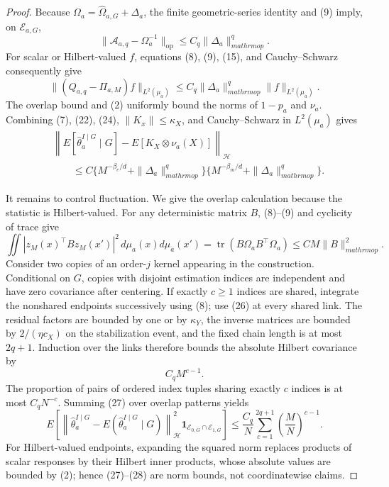 \documentclass{article}
\begin{document}
\begin{proof}
Because
\(
 \Omega_a=\widehat\Omega_{a,G}+\Delta_a
\), the finite geometric-series identity and (9) imply, on \(\mathcal E_{a,G}\),
\[
 \|\mathcal A_{a,q}-\Omega_a^{-1}\|_{\mathrm{op}}
 \leq C_q\|\Delta_a\|_{mathrm{op}}^q.
 \tag{23}
\]
For scalar or Hilbert-valued \(f\), equations (8), (9), (15), and Cauchy--Schwarz consequently give
\[
 \|(Q_{a,q}-\Pi_{a,M})f\|_{L^2(\mu_a)}
 \leq C_q\|\Delta_a\|_{mathrm{op}}^q
       \|f\|_{L^2(\mu_a)}.
 \tag{24}
\]
The overlap bound and (2) uniformly bound the norms of \(1-p_a\) and \(\nu_a\).  Combining (7), (22), (24), \(\|K_x\|\leq\kappa_X\), and Cauchy--Schwarz in \(L^2(\mu_a)\) gives
\[
 \begin{aligned}
 &\left\|E[\widehat\theta_a^{I\mid G}\mid G]
       -E[K_X\otimes\nu_a(X)]\right\|_{\mathcal H}\\
 &\qquad\leq
 C\{M^{-\beta_e/d}+\|\Delta_a\|_{mathrm{op}}^q\}
  \{M^{-\beta_m/d}+\|\Delta_a\|_{mathrm{op}}^q\}.
 \end{aligned}
 \tag{25}
\]

It remains to control fluctuation.  We give the overlap calculation because the statistic is Hilbert-valued.  For any deterministic matrix \(B\), (8)--(9) and cyclicity of trace give
\[
 \iint|z_M(x)^\top Bz_M(x')|^2
       \,d\mu_a(x)d\mu_a(x')
 =\operatorname{tr}(B\Omega_aB^\top\Omega_a)
 \leq CM\|B\|_{mathrm{op}}^2.
 \tag{26}
\]
Consider two copies of an order-\(j\) kernel appearing in the construction.  Conditional on \(G\), copies with disjoint estimation indices are independent and have zero covariance after centering.  If exactly \(c\geq1\) indices are shared, integrate the nonshared endpoints successively using (8); use (26) at every shared link.  The residual factors are bounded by one or by \(\kappa_Y\), the inverse matrices are bounded by \(2/(\eta c_X)\) on the stabilization event, and the fixed chain length is at most \(2q+1\).  Induction over the links therefore bounds the absolute Hilbert covariance by
\[
 C_qM^{c-1}.
 \tag{27}
\]
The proportion of pairs of ordered index tuples sharing exactly \(c\) indices is at most \(C_qN^{-c}\).  Summing (27) over overlap patterns yields
\[
 E\!\left[
  \left\|\widehat\theta_a^{I\mid G}
    -E(\widehat\theta_a^{I\mid G}\mid G)\right\|_{\mathcal H}^2
  \mathbf 1_{\mathcal E_{0,G}\cap\mathcal E_{1,G}}
 \right]
 \leq\frac{C_q}{N}
       \sum_{c=1}^{2q+1}\left(\frac{M}{N}\right)^{c-1}.
 \tag{28}
\]
For Hilbert-valued endpoints, expanding the squared norm replaces products of scalar responses by their Hilbert inner products, whose absolute values are bounded by (2); hence (27)--(28) are norm bounds, not coordinatewise claims.


\end{proof}
\end{document}
